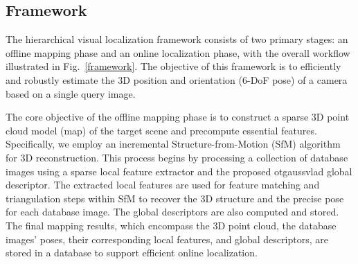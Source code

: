 \documentclass[journal]{IEEEtran}
\begin{document}
\subsection{Framework}
The hierarchical visual localization framework consists of two primary stages: an offline mapping phase and an online localization phase, with the overall workflow illustrated in Fig.~\ref{framework}. The objective of this framework is to efficiently and robustly estimate the 3D position and orientation (6-DoF pose) of a camera based on a single query image.

The core objective of the offline mapping phase is to construct a sparse 3D point cloud model (map) of the target scene and precompute essential features. Specifically, we employ an incremental Structure-from-Motion (SfM) algorithm for 3D reconstruction. This process begins by processing a collection of database images using a sparse local feature extractor and the proposed otgaussvlad global descriptor. The extracted local features are used for feature matching and triangulation steps within SfM to recover the 3D structure and the precise pose for each database image. The global descriptors are also computed and stored. The final mapping results, which encompass the 3D point cloud, the database images' poses, their corresponding local features, and global descriptors, are stored in a database to support efficient online localization.
\end{document}
